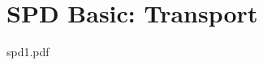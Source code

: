 \documentclass[slidev]{NoteBeamer}
\author{Axia}
\begin{document}

\chapter{SPD Basic: Transport}{spd1.pdf}

\clearnote
\end{document}
